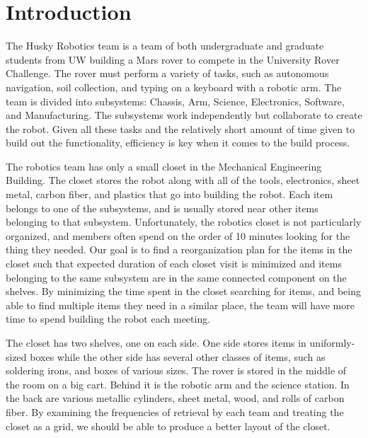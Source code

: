 \documentclass[10pt]{article}
\theoremstyle{named}
\begin{document}
\section{Introduction}
The Husky Robotics team is a team of both undergraduate and graduate students
from UW building a Mars rover to compete in the University Rover Challenge.
The rover must perform a variety of tasks, such as autonomous navigation, soil
collection, and typing on a keyboard with a robotic arm. The team is divided
into subsystems: Chassis, Arm, Science, Electronics, Software, and Manufacturing.
The subsystems work independently but collaborate to create the robot. Given
all these tasks and the relatively short amount of time given to build out the
functionality, efficiency is key when it comes to the build process.
\par
The robotics team has only a small closet in the Mechanical Engineering Building.
The closet stores the robot along with all of the tools, electronics, sheet metal,
carbon fiber, and plastics that go into building the robot. Each item belongs to
one of the subsystems, and is usually stored near other items belonging to that
subsystem. Unfortunately, the robotics closet is not particularly organized, and
members often spend on the order of 10 minutes looking for the thing they needed.
Our goal is to find a reorganization plan for the items in the closet such that
expected duration of each closet visit is minimized and items belonging to the
same subsystem are in the same connected component on the shelves. By minimizing the time spent in the closet searching for items, and being able to find multiple items they need in a similar place, the team will have more time to spend building the robot each meeting.
\par
The closet has two shelves, one on each side. One side stores items in
uniformly-sized boxes while the other side has several other classes of items,
such as soldering irons, and boxes of various sizes. The rover is stored in
the middle of the room on a big cart. Behind it is the robotic arm and the
science station. In the back are various metallic cylinders, sheet metal,
wood, and rolls of carbon fiber. By examining the frequencies of retrieval
by each team and treating the closet as a grid, we should be able to produce
a better layout of the closet.
\pagebreak
\end{document}
